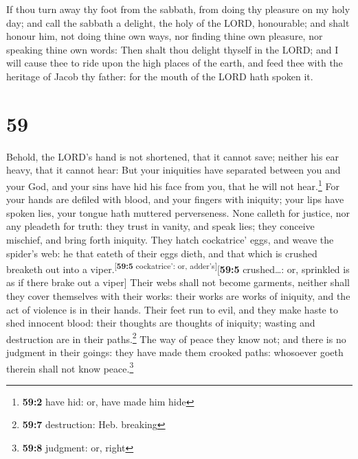  If thou turn away thy foot from the sabbath, from doing
thy pleasure on my holy day; and call the sabbath a delight, the holy of
the LORD, honourable; and shalt honour him, not doing thine own ways,
nor finding thine own pleasure, nor speaking thine own words:
 Then shalt thou delight thyself in the LORD; and I will
cause thee to ride upon the high places of the earth, and feed thee with
the heritage of Jacob thy father: for the mouth of the LORD hath spoken
it.

\hypertarget{section-58}{%
\section{59}\label{section-58}}

 Behold, the LORD's hand is not shortened, that it cannot
save; neither his ear heavy, that it cannot hear:  But
your iniquities have separated between you and your God, and your sins
have hid his face from you, that he will not hear.\footnote{\textbf{59:2}
  have hid: or, have made him hide}  For your hands are
defiled with blood, and your fingers with iniquity; your lips have
spoken lies, your tongue hath muttered perverseness.  None
calleth for justice, nor any pleadeth for truth: they trust in vanity,
and speak lies; they conceive mischief, and bring forth iniquity.
 They hatch cockatrice' eggs, and weave the spider's web:
he that eateth of their eggs dieth, and that which is crushed breaketh
out into a viper.\textsuperscript{{[}\textbf{59:5} cockatrice': or,
adder's{]}}{[}\textbf{59:5} crushed\ldots: or, sprinkled is as if there
brake out a viper{]}  Their webs shall not become
garments, neither shall they cover themselves with their works: their
works are works of iniquity, and the act of violence is in their hands.
 Their feet run to evil, and they make haste to shed
innocent blood: their thoughts are thoughts of iniquity; wasting and
destruction are in their paths.\footnote{\textbf{59:7} destruction: Heb.
  breaking}  The way of peace they know not; and there is
no judgment in their goings: they have made them crooked paths:
whosoever goeth therein shall not know peace.\footnote{\textbf{59:8}
  judgment: or, right}

